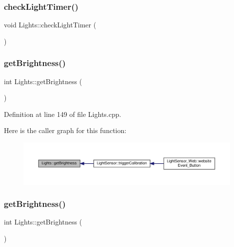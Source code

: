 \subsubsection{\texorpdfstring{check\+Light\+Timer()}{checkLightTimer()}\hspace{0.1cm}{\footnotesize\ttfamily [2/2]}}
{\footnotesize\ttfamily void Lights\+::check\+Light\+Timer (\begin{DoxyParamCaption}{ }\end{DoxyParamCaption})\hspace{0.3cm}{\ttfamily [protected]}}

\mbox{\label{class_lights_aea8e88f2668fbcc2d3e36dcfe51fbfa5}} 
\subsubsection{\texorpdfstring{get\+Brightness()}{getBrightness()}\hspace{0.1cm}{\footnotesize\ttfamily [1/2]}}
{\footnotesize\ttfamily int Lights\+::get\+Brightness (\begin{DoxyParamCaption}{ }\end{DoxyParamCaption})}



Definition at line 149 of file Lights.\+cpp.

Here is the caller graph for this function\+:
\nopagebreak
\begin{figure}[H]
\begin{center}
\leavevmode
\includegraphics[width=350pt]{class_lights_aea8e88f2668fbcc2d3e36dcfe51fbfa5_icgraph}
\end{center}
\end{figure}
\mbox{\label{class_lights_aea8e88f2668fbcc2d3e36dcfe51fbfa5}} 
\subsubsection{\texorpdfstring{get\+Brightness()}{getBrightness()}\hspace{0.1cm}{\footnotesize\ttfamily [2/2]}}
{\footnotesize\ttfamily int Lights\+::get\+Brightness (\begin{DoxyParamCaption}{ }\end{DoxyParamCaption})}

